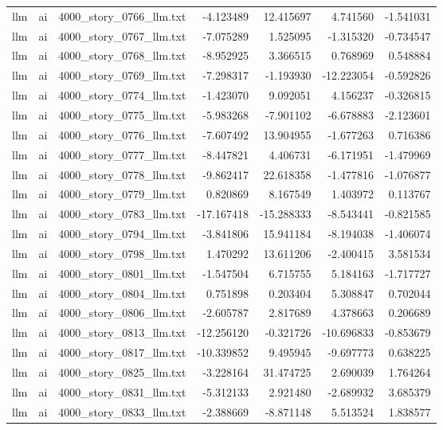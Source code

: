 \begin{longtable}{lllrrrr}
llm & ai & 4000\_story\_0766\_llm.txt & -4.123489 & 12.415697 & 4.741560 & -1.541031 \\
llm & ai & 4000\_story\_0767\_llm.txt & -7.075289 & 1.525095 & -1.315320 & -0.734547 \\
llm & ai & 4000\_story\_0768\_llm.txt & -8.952925 & 3.366515 & 0.768969 & 0.548884 \\
llm & ai & 4000\_story\_0769\_llm.txt & -7.298317 & -1.193930 & -12.223054 & -0.592826 \\
llm & ai & 4000\_story\_0774\_llm.txt & -1.423070 & 9.092051 & 4.156237 & -0.326815 \\
llm & ai & 4000\_story\_0775\_llm.txt & -5.983268 & -7.901102 & -6.678883 & -2.123601 \\
llm & ai & 4000\_story\_0776\_llm.txt & -7.607492 & 13.904955 & -1.677263 & 0.716386 \\
llm & ai & 4000\_story\_0777\_llm.txt & -8.447821 & 4.406731 & -6.171951 & -1.479969 \\
llm & ai & 4000\_story\_0778\_llm.txt & -9.862417 & 22.618358 & -1.477816 & -1.076877 \\
llm & ai & 4000\_story\_0779\_llm.txt & 0.820869 & 8.167549 & 1.403972 & 0.113767 \\
llm & ai & 4000\_story\_0783\_llm.txt & -17.167418 & -15.288333 & -8.543441 & -0.821585 \\
llm & ai & 4000\_story\_0794\_llm.txt & -3.841806 & 15.941184 & -8.194038 & -1.406074 \\
llm & ai & 4000\_story\_0798\_llm.txt & 1.470292 & 13.611206 & -2.400415 & 3.581534 \\
llm & ai & 4000\_story\_0801\_llm.txt & -1.547504 & 6.715755 & 5.184163 & -1.717727 \\
llm & ai & 4000\_story\_0804\_llm.txt & 0.751898 & 0.203404 & 5.308847 & 0.702044 \\
llm & ai & 4000\_story\_0806\_llm.txt & -2.605787 & 2.817689 & 4.378663 & 0.206689 \\
llm & ai & 4000\_story\_0813\_llm.txt & -12.256120 & -0.321726 & -10.696833 & -0.853679 \\
llm & ai & 4000\_story\_0817\_llm.txt & -10.339852 & 9.495945 & -9.697773 & 0.638225 \\
llm & ai & 4000\_story\_0825\_llm.txt & -3.228164 & 31.474725 & 2.690039 & 1.764264 \\
llm & ai & 4000\_story\_0831\_llm.txt & -5.312133 & 2.921480 & -2.689932 & 3.685379 \\
llm & ai & 4000\_story\_0833\_llm.txt & -2.388669 & -8.871148 & 5.513524 & 1.838577 \\

\end{longtable}

